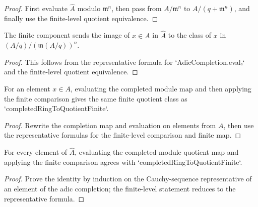 \begin{proof}
  First evaluate \(\widehat A\) modulo \(\mathfrak m^n\), then pass from
  \(A/\mathfrak m^n\) to \(A/(q+\mathfrak m^n)\), and finally use the
  finite-level quotient equivalence.
\end{proof}

\begin{lemma}
  \label{lem:completed_ring_to_quotient_finite_of}
  The finite component sends the image of \(x\in A\) in \(\widehat A\) to the
  class of \(x\) in \((A/q)/(\mathfrak m(A/q))^n\).
\end{lemma}

\begin{proof}
  This follows from the representative formula for `AdicCompletion.evalₐ` and
  the finite-level quotient equivalence.
\end{proof}

\begin{lemma}
  \label{lem:quotient_module_level_to_ring_level_equiv_eval_map_of}
  For an element \(x\in A\), evaluating the completed module map and then
  applying the finite comparison gives the same finite quotient class as
  `completedRingToQuotientFinite`.
\end{lemma}

\begin{proof}
  Rewrite the completion map and evaluation on elements from \(A\), then use
  the representative formulas for the finite-level comparison and finite map.
\end{proof}

\begin{lemma}
  \label{lem:quotient_module_level_to_ring_level_equiv_eval_map}
  For every element of \(\widehat A\), evaluating the completed module quotient
  map and applying the finite comparison agrees with
  `completedRingToQuotientFinite`.
\end{lemma}

\begin{proof}
  Prove the identity by induction on the Cauchy-sequence representative of an
  element of the adic completion; the finite-level statement reduces to the
  representative formula.
\end{proof}


